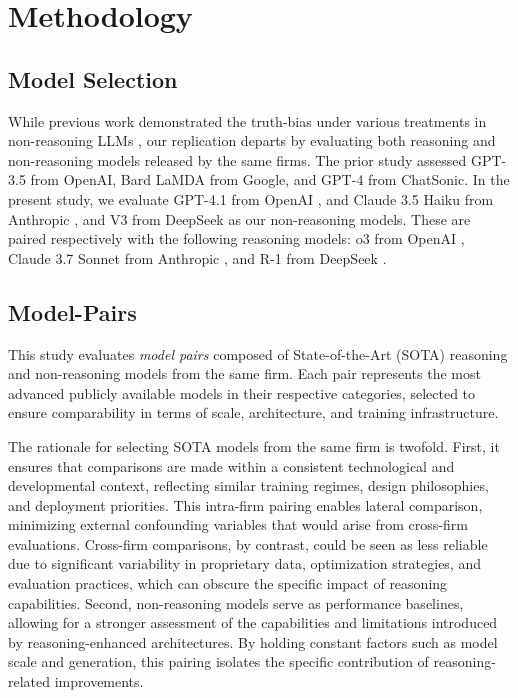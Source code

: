 \documentclass{article}
\begin{document}
\section{Methodology}
\label{sec:methodology}

\subsection{Model Selection}

While previous work demonstrated the truth-bias under various treatments in non-reasoning LLMs \citep{markowitz_generative_2024}, our replication departs by evaluating both reasoning and non-reasoning models released by the same firms. The prior study assessed GPT-3.5 from OpenAI, Bard LaMDA from Google, and GPT-4 from ChatSonic. In the present study, we evaluate GPT-4.1 from OpenAI \citep{OpenAI_4-1_API_2025}, and Claude 3.5 Haiku from Anthropic \citep{anthropic_claude_2024}, and V3 from DeepSeek \citep{deepseekai2025deepseekv3technicalreport} as our non-reasoning models. These are paired respectively with the following reasoning models: o3 from OpenAI \citep{openai_o3_o4m_systemcard2024}, Claude 3.7 Sonnet from Anthropic \citep{anthropic_claude_2025}, and R-1 from DeepSeek \citep{deepseek-ai_deepseek-r1_2025}.

\subsection{Model-Pairs}

This study evaluates \textit{model pairs} composed of State-of-the-Art (SOTA) reasoning and non-reasoning models from the same firm. Each pair represents the most advanced publicly available models in their respective categories, selected to ensure comparability in terms of scale, architecture, and training infrastructure.

The rationale for selecting SOTA models from the same firm is twofold. First, it ensures that comparisons are made within a consistent technological and developmental context, reflecting similar training regimes, design philosophies, and deployment priorities. This intra-firm pairing enables lateral comparison, minimizing external confounding variables that would arise from cross-firm evaluations. Cross-firm comparisons, by contrast, could be seen as less reliable due to significant variability in proprietary data, optimization strategies, and evaluation practices, which can obscure the specific impact of reasoning capabilities. Second, non-reasoning models serve as performance baselines, allowing for a stronger assessment of the capabilities and limitations introduced by reasoning-enhanced architectures. By holding constant factors such as model scale and generation, this pairing isolates the specific contribution of reasoning-related improvements.
\end{document}
